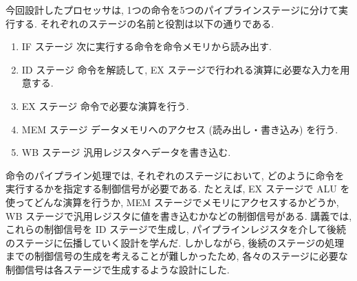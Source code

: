 \documentclass[../specifications.tex]{subfiles}
\begin{document}
  今回設計したプロセッサは, 1つの命令を5つのパイプラインステージに分けて実行する.
  それぞれのステージの名前と役割は以下の通りである.
  \begin{enumerate}
    \item IF ステージ
    \newline 次に実行する命令を命令メモリから読み出す.

    \item ID ステージ
    \newline 命令を解読して, EX ステージで行われる演算に必要な入力を用意する.

    \item EX ステージ
    \newline 命令で必要な演算を行う.

    \item MEM ステージ
    \newline データメモリへのアクセス (読み出し・書き込み) を行う.

    \item WB ステージ
    \newline 汎用レジスタへデータを書き込む.
  \end{enumerate}

  命令のパイプライン処理では, それぞれのステージにおいて, 
  どのように命令を実行するかを指定する制御信号が必要である.
  たとえば, EX ステージで ALU を使ってどんな演算を行うか, 
  MEM ステージでメモリにアクセスするかどうか, 
  WB ステージで汎用レジスタに値を書き込むかなどの制御信号がある.
  講義では, これらの制御信号を ID ステージで生成し, 
  パイプラインレジスタを介して後続のステージに伝播していく設計を学んだ.
  しかしながら, 後続のステージの処理までの制御信号の生成を考えることが難しかったため, 
  各々のステージに必要な制御信号は各ステージで生成するような設計にした.

  
\end{document}
